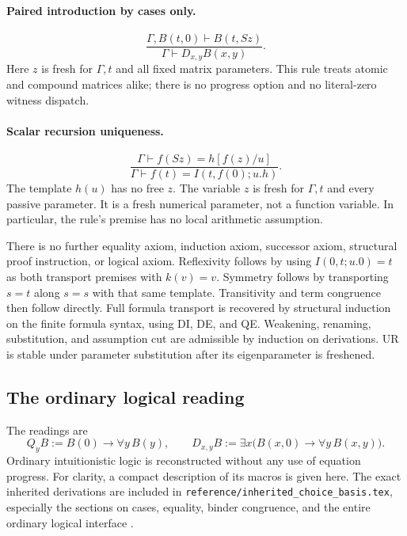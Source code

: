 \documentclass[11pt]{article}
\theoremstyle{definition}\newtheorem{definition}[theorem]{Definition}
\newcommand{\file}[1]{{\small\nolinkurl{#1}}}
\begin{document}
\paragraph{Paired introduction by cases only.}
\[
 \frac{\Gamma,B(t,0)\vdash B(t,Sz)}
      {\Gamma\vdash D_{x,y}B(x,y)}.                    \tag{DI}
\]
Here $z$ is fresh for $\Gamma,t$ and all fixed matrix parameters.
This rule treats atomic and compound matrices alike; there is no
progress option and no literal-zero witness dispatch.

\paragraph{Scalar recursion uniqueness.}
\[
 \frac{\Gamma\vdash f(Sz)=h[f(z)/u]}
      {\Gamma\vdash f(t)=I(t,f(0);u.h)}.               \tag{UR}
\]
The template $h(u)$ has no free $z$.  The variable $z$ is fresh for
$\Gamma,t$ and every passive parameter.  It is a fresh numerical
parameter, not a function variable.  In particular, the rule's premise
has no local arithmetic assumption.

There is no further equality axiom, induction axiom, successor axiom,
structural proof instruction, or logical axiom.  Reflexivity follows by
using $I(0,t;u.0)=t$ as both transport premises with $k(v)=v$.
Symmetry follows by transporting $s=t$ along $s=s$ with that same
template.  Transitivity and term congruence then follow directly.
Full formula transport is recovered by structural induction on the finite
formula syntax, using DI, DE, and QE.  Weakening, renaming, substitution,
and assumption cut are admissible by induction on derivations.  UR is
stable under parameter substitution after its eigenparameter is freshened.

\subsection{The ordinary logical reading}
The readings are
\[
 Q_yB:=B(0)\to\forall y\,B(y),\qquad
 D_{x,y}B:=\exists x\bigl(B(x,0)\to\forall y\,B(x,y)\bigr).
\]
Ordinary intuitionistic logic is reconstructed without any use of
equation progress.  For clarity, a compact description of its macros is
given here.  The exact inherited derivations are included in
\file{reference/inherited_choice_basis.tex}, especially the sections on
cases, equality, binder congruence, and the entire ordinary logical
interface \cite{choice}.
\end{document}
